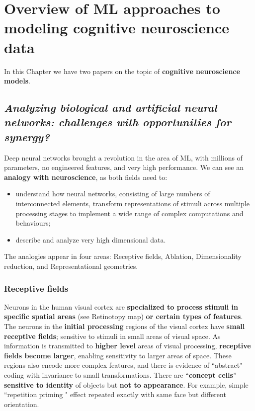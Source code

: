\chapter{Overview of ML approaches to modeling cognitive neuroscience data}
\label{chap:overview}

In this Chapter we have two papers on the topic of \textbf{cognitive neuroscience models}.

\section[Analyzing biological and artificial neural networks]{\textit{Analyzing biological and artificial neural networks: challenges with opportunities for synergy?}\\ \cite{BARRETT201955}}

Deep neural networks brought a revolution in the area of ML, with millions of parameters, no engineered features, and very high performance. We can see an \textbf{analogy with neuroscience}, as both fields need to:
\begin{itemize}
    \item understand how neural networks, consisting of large numbers of interconnected elements, transform representations of stimuli across multiple processing stages to implement a wide range of complex computations and behaviours;
    \item describe and analyze very high dimensional data.
\end{itemize}

The analogies appear in four areas: Receptive fields, Ablation, Dimensionality reduction, and Representational geometries.

\subsection{Receptive fields}
Neurons in the human visual cortex are \textbf{specialized to process stimuli in specific spatial areas} (see \notedv Retinotopy map) \textbf{or certain types of features}.
The neurons in the \textbf{initial processing} regions of the visual cortex have \textbf{small receptive fields}; sensitive to stimuli in small areas of visual space.
As information is transmitted to \textbf{higher level} areas of visual processing, \textbf{receptive fields become larger}, enabling sensitivity to larger areas of space. These regions also encode more complex features, and there is evidence of ``abstract" coding with invariance to small transformations. There are ``\textbf{concept cells}” \textbf{sensitive to identity} of objects but \textbf{not to appearance}. For example, simple ``repetition priming \notet" effect repeated exactly with same face but different orientation.

